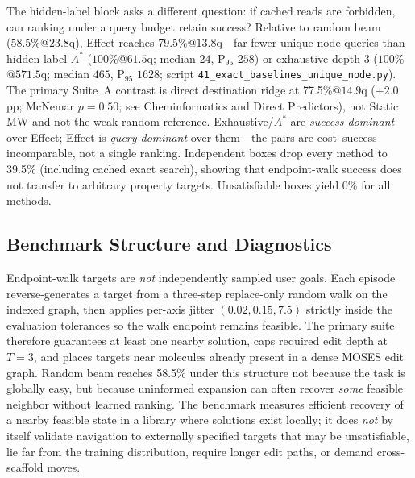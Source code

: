 \documentclass[journal=jcisd8,manuscript=article,email=false]{achemso}
\begin{document}
The hidden-label block asks a different question: if cached reads are forbidden, can ranking under a query budget retain success? Relative to random beam (58.5\%@$23.8$q), Effect reaches 79.5\%@$13.8$q---far fewer unique-node queries than hidden-label $A^\ast$ ($100\%$@$61.5$q; median $24$, P$_{95}$ $258$) or exhaustive depth-3 ($100\%$@$571.5$q; median $465$, P$_{95}$ $1628$; script \texttt{41\_exact\_baselines\_unique\_node.py}). The primary Suite~A contrast is direct destination ridge at 77.5\%@$14.9$q ($+2.0$pp; McNemar $p{=}0.50$; see Cheminformatics and Direct Predictors), not Static MW and not the weak random reference. Exhaustive/$A^\ast$ are \emph{success-dominant} over Effect; Effect is \emph{query-dominant} over them---the pairs are cost--success incomparable, not a single ranking. Independent boxes drop every method to 39.5\% (including cached exact search), showing that endpoint-walk success does not transfer to arbitrary property targets. Unsatisfiable boxes yield 0\% for all methods.

\subsection{Benchmark Structure and Diagnostics}
\label{sec:benchmark_diag}

Endpoint-walk targets are \emph{not} independently sampled user goals. Each episode reverse-generates a target from a three-step replace-only random walk on the indexed graph, then applies per-axis jitter $(0.02,0.15,7.5)$ strictly inside the evaluation tolerances so the walk endpoint remains feasible. The primary suite therefore guarantees at least one nearby solution, caps required edit depth at $T{=}3$, and places targets near molecules already present in a dense MOSES edit graph. Random beam reaches 58.5\% under this structure not because the task is globally easy, but because uninformed expansion can often recover \emph{some} feasible neighbor without learned ranking. The benchmark measures efficient recovery of a nearby feasible state in a library where solutions exist locally; it does \emph{not} by itself validate navigation to externally specified targets that may be unsatisfiable, lie far from the training distribution, require longer edit paths, or demand cross-scaffold moves.
\end{document}
